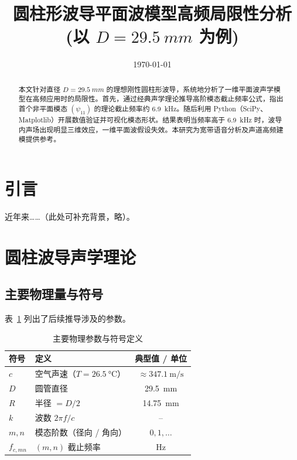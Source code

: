 \documentclass[12pt,a4paper]{article}
\title{圆柱形波导平面波模型高频局限性分析\\(以 $D=\SI{29.5}{mm}$ 为例)}
\author{}
\date{\today}
\begin{document}
\maketitle

\begin{abstract}
本文针对直径 $D=\SI{29.5}{mm}$ 的理想刚性圆柱形波导，系统地分析了一维平面波声学模型在高频应用时的局限性。首先，通过经典声学理论推导高阶模态截止频率公式，指出首个非平面模态 $(\psi_{11})$ 的理论截止频率约 \SI{6.9}{kHz}。随后利用 Python（SciPy、Matplotlib）开展数值验证并可视化模态形状。结果表明当频率高于 \SI{6.9}{kHz} 时，波导内声场出现明显三维效应，一维平面波假设失效。本研究为宽带语音分析及声道高频建模提供参考。
\end{abstract}

\tableofcontents
\newpage

\section{引言}
近年来……（此处可补充背景，略）。

\section{圆柱波导声学理论}

\subsection{主要物理量与符号}
表~\ref{tab:param} 列出了后续推导涉及的参数。

\begin{table}[h]
  \centering
  \caption{主要物理参数与符号定义}
  \label{tab:param}
  \begin{tabular}{llc}
    \toprule
    符号 & 定义 & 典型值 / 单位 \\
    \midrule
    $c$ & 空气声速（$T=\SI{26.5}{\celsius}$） & $\approx\SI{347.1}{\meter\per\second}$ \\
    $D$ & 圆管直径 & \SI{29.5}{\milli\meter} \\
    $R$ & 半径 $=D/2$ & \SI{14.75}{\milli\meter} \\
    $k$ & 波数 $2\pi f/c$ & -- \\
    $m,n$ & 模态阶数（径向 / 角向） & $0,1,\dots$ \\
    $f_{c,mn}$ & $(m,n)$ 截止频率 & \si{\hertz} \\
    \bottomrule
  \end{tabular}
\end{table}
\end{document}
